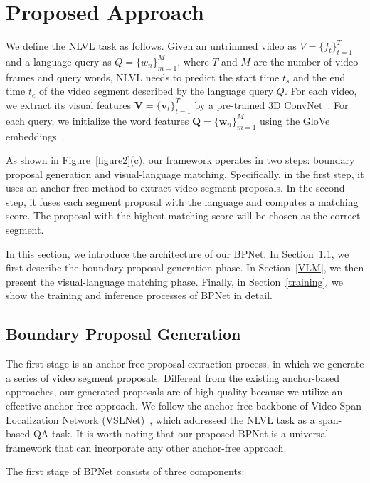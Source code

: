 \documentclass[letterpaper]{article} %
\begin{document}
\section{Proposed Approach}
We define the NLVL task as follows. Given an untrimmed video as $V=\{f_t\}^T_{t=1}$ and a language query
as $Q=\{w_n\}^M_{m=1}$, where $T$ and $M$ are the number of video frames and query words, NLVL needs to predict the
start time $t_s$ and the end time $t_e$ of the video segment described by the language query $Q$.
For each video, we extract its visual features $\bm{V} = \{\bm{v}_t\}^T_{t=1}$ by a pre-trained 3D ConvNet~\cite{DBLP:conf/iccv/TranBFTP15}. For each query, we initialize the word features $\bm{Q} = \{\bm{w}_n\}^M_{m=1}$ using the GloVe embeddings~\cite{DBLP:conf/emnlp/PenningtonSM14}.

As shown in Figure~\ref{figure2}(c), our framework operates in two steps: boundary proposal generation and visual-language matching. Specifically, in the first step, it uses an anchor-free method to extract video segment proposals. In the second step, it fuses each segment proposal with the language and computes a matching score. The proposal with the highest matching score will be chosen as the correct segment.

In this section, we introduce the architecture of our BPNet. In Section~\ref{BPG}, we first describe the boundary proposal generation phase. In Section~\ref{VLM}, we then present the visual-language matching phase. Finally, in Section~\ref{training}, we show the training and inference processes of BPNet in detail.

\subsection{Boundary Proposal Generation}\label{BPG}
The first stage is an anchor-free proposal extraction process, in which we generate a series of video segment proposals. Different from
the existing anchor-based approaches, our generated proposals are of
high quality because we utilize an effective anchor-free approach.
We follow the anchor-free backbone of Video Span Localization Network (VSLNet)~\cite{DBLP:conf/acl/ZhangSJZ20}, which addressed the NLVL task as a span-based QA task. It is worth noting that our proposed BPNet is
a universal framework that can incorporate any other anchor-free
approach.

The first stage of BPNet consists of three components:
\end{document}
